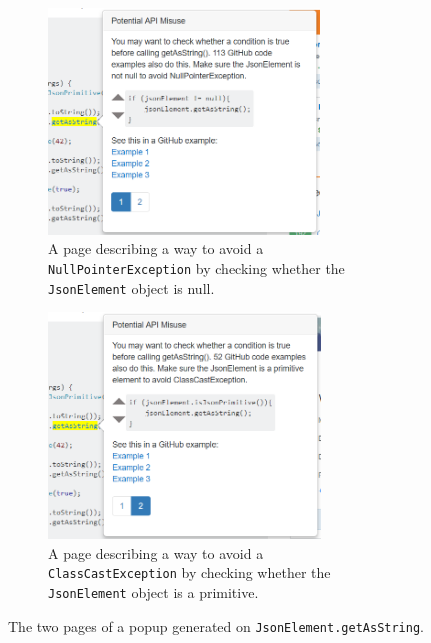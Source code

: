 \begin{figure}[t!]
\centering
  \begin{subfigure}[t]{0.48\textwidth}
  \includegraphics[width=\textwidth, height=6cm]{json_ex2.PNG}
  \caption{A page describing a way to avoid a {\tt NullPointerException} by checking whether the {\tt JsonElement} object is null. } 
  \label{fig:page1}
  \end{subfigure}
  \hspace{0.02\textwidth}
  \begin{subfigure}[t]{0.48\textwidth}
  \includegraphics[width=\textwidth, height=6cm]{json_ex3.PNG}
  \caption{A page describing a way to avoid a {\tt ClassCastException} by checking whether the {\tt JsonElement} object is a primitive.}
  \label{fig:page2}
  \end{subfigure}
  \hfill
  \vspace{0.02\textwidth}
\caption{The two pages of a popup generated on {\tt JsonElement.getAsString}.}
\label{fig:features}
\end{figure}


